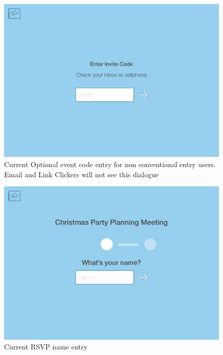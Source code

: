 \documentclass{sigchi}
\begin{document}
\begin{figure}
  \centering
  \includegraphics[width=1.75\columnwidth]{Mockup/EnterEventCode}
  \caption{Current Optional event code entry for non conventional entry users. Email and Link Clickers will not see this dialogue}
\end{figure}

\begin{figure}
  \centering
  \includegraphics[width=1.75\columnwidth]{Mockup/RSVPEnterName}
  \caption{Current RSVP name entry}
\end{figure}
\end{document}
